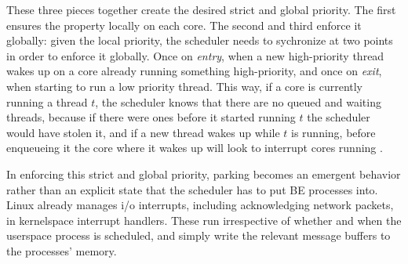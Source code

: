 These three pieces together create the desired strict and global priority. The
first ensures the property locally on each core. The second and third enforce it
globally: given the local priority, the scheduler needs to sychronize at two
points in order to enforce it globally. Once on \textit{entry}, when a new
high-priority thread wakes up on a core already running something high-priority,
and once on \textit{exit}, when starting to run a low priority thread. This way,
if a core is currently running a \beclass{} thread $t$, the scheduler knows that
there are no queued and waiting \normalclass{} threads, because if there were
ones before it started running $t$ the scheduler would have stolen it, and if a
new \normalclass{} thread wakes up while $t$ is running, before enqueueing it
the core where it wakes up will look to interrupt cores running \beclass{}.

In enforcing this strict and global priority, parking becomes an emergent
behavior rather than an explicit state that the scheduler has to put BE
processes into. Linux already manages i/o interrupts, including acknowledging
network packets, in kernelspace interrupt handlers. These run irrespective of
whether and when the userspace process is scheduled, and simply write the
relevant message buffers to the processes' memory.
